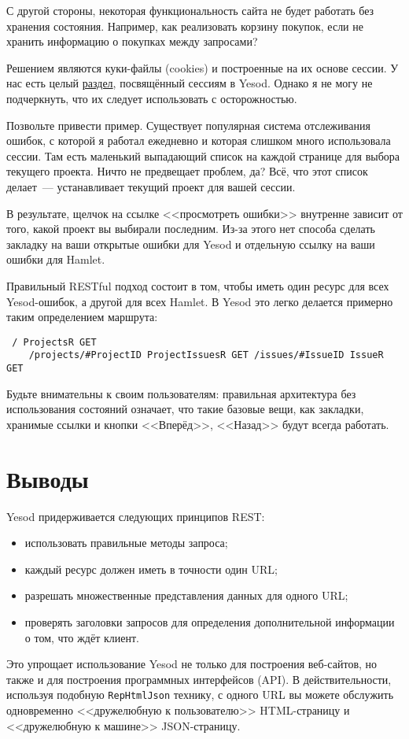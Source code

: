 С другой стороны, некоторая функциональность сайта не будет работать без
хранения состояния. Например, как реализовать корзину покупок, если не хранить
информацию о покупках между запросами?

Решением являются куки-файлы (cookies) и построенные на их основе сессии. У нас
есть целый \hyperref[chap:sessions]{раздел}, посвящённый сессиям в Yesod.
Однако я не могу не подчеркнуть, что их следует использовать с осторожностью.

Позвольте привести пример. Существует популярная система отслеживания ошибок, с
которой я работал ежедневно и которая слишком много использовала сессии. Там
есть маленький выпадающий список на каждой странице для выбора текущего
проекта. Ничто не предвещает проблем, да? Всё, что этот список делает~---
устанавливает текущий проект для вашей сессии.

В результате, щелчок на ссылке <<просмотреть ошибки>> внутренне зависит от
того, какой проект вы выбирали последним. Из-за этого нет способа сделать
закладку на ваши открытые ошибки для Yesod и отдельную ссылку на ваши ошибки
для Hamlet.

Правильный RESTful подход состоит в том, чтобы иметь один ресурс для всех
Yesod-ошибок, а другой для всех Hamlet. В Yesod это легко делается примерно
таким определением маршрута: \begin{lstlisting} / ProjectsR GET
    /projects/#ProjectID ProjectIssuesR GET /issues/#IssueID IssueR GET
\end{lstlisting}

Будьте внимательны к своим пользователям: правильная архитектура без
использования состояний означает, что такие базовые вещи, как закладки,
хранимые ссылки и кнопки <<Вперёд>>, <<Назад>> будут всегда работать.

\section{Выводы}

Yesod придерживается следующих принципов REST:
\begin{itemize}
    \item использовать правильные методы запроса;
    \item каждый ресурс должен иметь в точности один URL;
    \item разрешать множественные представления данных для одного URL;
    \item проверять заголовки запросов для определения дополнительной
        информации о том, что ждёт клиент.
\end{itemize}

Это упрощает использование Yesod не только для построения веб-сайтов, но также
и для построения программных интерфейсов (API). В действительности, используя
подобную \verb*|RepHtmlJson| технику, с одного URL вы можете обслужить
одновременно <<дружелюбную к пользователю>> HTML-страницу и <<дружелюбную к
машине>> JSON-страницу.
